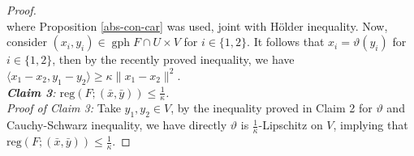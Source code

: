 \documentclass[smallextended,envcountsect,envcountsame]{svjour3}
\newcommand{\gph}{\operatorname{gph}}
\newcommand{\1}{\mathds{1}}
\begin{document}
\begin{proof}
\begin{equation*}
		\end{equation*}
		where Proposition \ref{abs-con-car} was used, joint with Hölder inequality. Now, consider $(x_i,y_i)\in \gph F\cap U\times V$ for $i\in \{1,2\}$. It follows that $x_i = \vartheta(y_i)$ for $i\in \{1,2\}$, then by the recently proved inequality, we have $\langle x_1-x_2,y_1-y_2\rangle\geq \kappa\|x_1-x_2\|^2$.\\
		\emph{{\bf Claim 3}: $\text{reg}(F;(\bar x,\bar y))\leq \frac{1}{\kappa}$.}\\
		\emph{Proof of Claim 3:} Take $y_1,y_2\in V$, by the inequality proved in Claim 2 for $\vartheta$ and Cauchy-Schwarz inequality, we have directly $\vartheta$ is $\frac{1}{\kappa}$-Lipschitz on $V$, implying that $\text{reg}(F;(\bar x,\bar y))\leq \frac{1}{\kappa}$.
	\end{proof}
	
\end{document}
